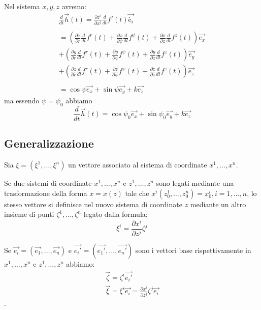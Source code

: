 \documentclass[a4paper,11pt]{article}
\begin{document}
Nel sistema $ x, y, z $ avremo:
\begin{eqnarray*}
  \frac{d}{dt} \vec h(t)= \frac{\partial z^i}{\partial x^j} \frac{d}{dt} f^j(t) \vec {è_i}
  \\
  \\
  = \left( \frac{\partial x}{\partial r} \frac{d}{dt} f^r(t) + \frac{\partial x}{\partial \psi} \frac{d}{dt} f^\psi(t) + \frac{\partial x}{\partial z} \frac{d}{dt} f^z(t) \right) \vec {e_x}
  \\
  + \left( \frac{\partial y}{\partial r} \frac{d}{dt} f^r(t) + \frac{\partial y}{\partial \psi} f^\psi(t) + \frac{\partial y}{\partial z} \frac{d}{dt} f^z(t) \right) \vec {e_y}
  \\
  + \left( \frac{\partial z}{\partial r} \frac{d}{dt} f^r(t) + \frac{\partial z}{\partial \psi} f^\psi(t) + \frac{\partial z}{\partial z} \frac{d}{dt} f^z(t) \right) \vec {e_z}
  \\
  \\
  = \cos \psi \vec {e_x} + \sin \psi \vec {e_y} + k \vec {e_z}
\end{eqnarray*}
ma essendo $ \psi = \psi_0 $ abbiamo 
\[
  \frac{d}{dt} \vec h(t)= \cos \psi_0 \vec {e_x} + \sin \psi_0 \vec {e_y} + k \vec {e_z}
\]

\subsection{Generalizzazione}

Sia $\xi = (\xi ^1, \dots , \xi ^n)$ un vettore associato al sistema di coordinate $ x^1, \dots , x^n $.

Se due sistemi di coordinate $ x^1, \dots , x^n $ e $ z^1, \dots , z^n $ sono legati mediante una trasformazione della forma $ x= x(z) $ tale che $ x^i (z_0^1, \dots , z_0^n) = x_0^i, i = 1, \dots , n $, lo stesso vettore si definisce nel nuovo sistema di coordinate $ z $ mediante un altro insieme di punti 
$ \zeta ^1, \dots, \zeta ^n $ legato dalla formula:
\begin{equation}\label{eq:trasformaVettore}
  \xi ^i = \frac{\partial x^i}{\partial z^j} \zeta ^j
\end{equation}

Se $ \vec {e_i} = (\vec {e_1}, \dots, \vec {e_n}) $ e $ \vec {e_i'} = (\vec {e_1'}, \dots, \vec {e_n'}) $ sono i vettori base rispettivamente in $ x^1, \dots , x^n $ e $  z^1, \dots , z^n $ abbiamo:
\begin{eqnarray*}
  \vec \zeta = \zeta^i \vec {e_i'}
  \\
  \vec \xi = \xi^i \vec {e_i} = \frac{\partial x^i}{\partial z^j} \zeta ^j \vec {e_i}
\end{eqnarray*}
.
\end{document}
